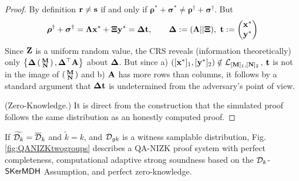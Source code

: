 \begin{proof}
By definition $\mathbf{r} \neq \mathbf{s}$  if and only if  $\boldsymbol \rho^{*}+\boldsymbol \sigma^{*} \neq 
\boldsymbol \rho^{\dagger}+ \boldsymbol \sigma^{\dagger}$.
But 
\begin{equation}
\boldsymbol \rho^{\dagger}+ \boldsymbol \sigma^{\dagger}=\mathbf{{\Lambda}}  \mathbf{x}^*+ \mathbf{{\Xi}} \mathbf{y}^*=
\mathbf{{\Delta}} \mathbf{t}, \qquad \mathbf{{\Delta}}:=(\mathbf{{\Lambda}}||\mathbf{{\Xi}}), \ \mathbf{t}:=\begin{pmatrix} \mathbf{x}^* \\ \mathbf{y}^* \end{pmatrix}
\end{equation}
Since $\mathbf{{Z}}$ is a uniform random value, the CRS reveals (information theoretically) only $\left\{\mathbf{{\Delta}}\left(\begin{smallmatrix}\mathbf{{M}}\\\mathbf{{N}}\end{smallmatrix}\right),  \mathbf{{\Delta}}^{\top}\mathbf{{A}} \right\}$ about $\mathbf{{\Delta}}$.
But since a) $([\mathbf{x}^*]_1,[\mathbf{y}^*]_2) \notin \mathcal{L}_{[\mathbf{{M}}]_1,[\mathbf{{N}}]_2}$, 
$\mathbf{t}$ is not in the image of $\left(\begin{smallmatrix}\mathbf{{M}}\\\mathbf{{N}}\end{smallmatrix}\right)$ and b) $\mathbf{{A}}$ has more rows than columns, it follows by a standard argument that $\mathbf{{\Delta}}\mathbf{t}$ is undetermined from the adversary's point of view.

(Zero-Knowledge.) It is direct from the construction that the simulated proof follows the same distribution as an honestly computed proof.
\end{proof}


\begin{theorem} If $\widetilde{\mathcal{D}_{k}}=\overline{\mathcal{D}}_k$ and $\tilde{k}=k$,  and $\mathcal{D}_{gk}$ is a witness samplable distribution, Fig. \ref{fig:QANIZKtwogroups}
describes a QA-NIZK proof system with perfect completeness, computational adaptive strong soundness based on the  $\mathcal{D}_{k}$-$\mathsf{SKerMDH}$ Assumption, and perfect zero-knowledge. 
\label{theo:membtwogroups2}
\end{theorem}

